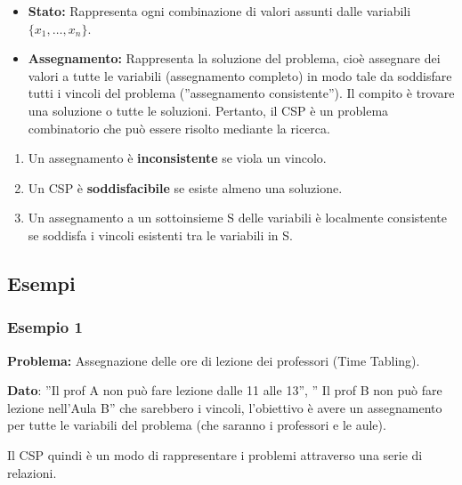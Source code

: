 \begin{itemize}
    \item \textbf{Stato:} Rappresenta ogni combinazione di valori assunti dalle
          variabili $\{x_1, \ldots, x_n\}$.
    \item \textbf{Assegnamento:} Rappresenta la soluzione del problema, cioè
          assegnare dei valori a tutte le variabili (assegnamento completo) in modo
          tale da soddisfare tutti i vincoli del problema (”assegnamento
          consistente”). Il compito è trovare una soluzione o tutte le soluzioni.
          Pertanto, il CSP è un problema combinatorio che può essere risolto mediante
          la ricerca.
\end{itemize}
\begin{enumerate}
    \item Un assegnamento è \textbf{inconsistente} se viola un vincolo.
    \item Un CSP è \textbf{soddisfacibile} se esiste almeno una soluzione.
    \item Un assegnamento a un sottoinsieme S delle variabili è localmente
          consistente se soddisfa i vincoli esistenti tra le variabili in S.
\end{enumerate}

\subsection{Esempi}
\subsubsection{Esempio 1}
\textbf{Problema:} Assegnazione delle ore di lezione dei professori (Time
Tabling).

\vspace{0.2cm}

\noindent \textbf{Dato}: ”Il prof A non può fare lezione dalle 11 alle 13”, ” Il
prof B non può fare lezione nell'Aula B” che sarebbero i vincoli, l'obiettivo è
avere un assegnamento per tutte le variabili del problema (che saranno i
professori e le aule).
\vspace{0.2cm}

\noindent Il CSP quindi è un modo di rappresentare i problemi attraverso una
serie di relazioni.
\vspace{0.2cm}

